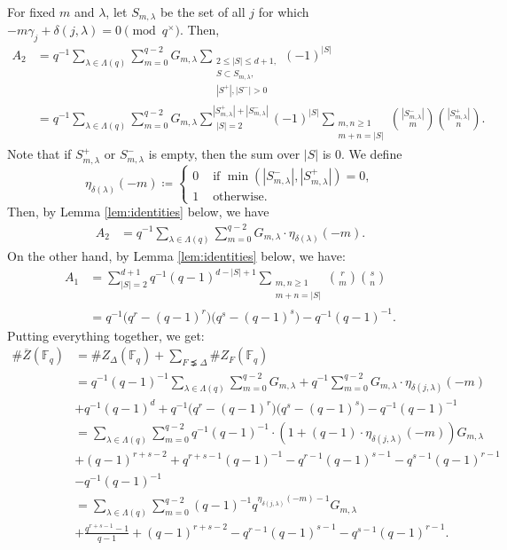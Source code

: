 \documentclass[11pt, reqno]{amsart}
\theoremstyle{plain}
\theoremstyle{definition}
\newcommand{\F}{\mathbb{F}}
\begin{document}
For fixed $m$ and $\lambda$, let $S_{m,\lambda}$  be the set of all $j$ for which  $-m \gamma_j +\delta(j,\lambda)=0 \pmod{q^\times}$. Then,
\begin{align}
A_2 &= q^{-1}\sum_{\lambda \in \Lambda(q)}  \sum_{m=0}^{q-2} G_{m,\lambda } \sum_{\substack{2\le |S|\le d+1, \\ S \subset S_{m,\lambda}, \\ |S^{+}|,|S^{-}|>0  }}(-1)^{|S|} \nonumber\\
&= q^{-1}\sum_{\lambda \in \Lambda(q)}  \sum_{m=0}^{q-2} G_{m,\lambda }\sum_{\substack{|S|=2}}^{|S_{m,\lambda}^+|+|S_{m,\lambda}^-|} (-1)^{|S|} \sum_{\substack{m,n\ge1\\ m+n =|S|}} { \binom{|S_{m,\lambda}^-| }{m}}{\binom{|S_{m,\lambda}^+|}{n}}.\nonumber
\end{align}
Note that if $S_{m,\lambda}^{+}$ or $S_{m,\lambda}^{-}$ is empty, then the sum over $|S|$ is $0$. We define 
\begin{equation}\label{eq:definition-eta}
\eta_{\delta(\lambda)}(-m) \coloneqq \begin{cases}
    0 &  \text{ if } \min( |S_{m,\lambda}^{-}|,|S_{m,\lambda}^{+}|) = 0,\\
    1 & \text{ otherwise.}
\end{cases}
\end{equation}
Then, by Lemma \ref{lem:identities} below, we have
\begin{align}
A_2 &=  q^{-1}\sum_{\lambda \in \Lambda(q)}  \sum_{m=0}^{q-2}G_{m,\lambda} \cdot \eta_{\delta(\lambda)}(-m).
\end{align}
On the other hand, by Lemma \ref{lem:identities} below, we have:
\begin{align*}
    A_1 &= \sum_{ |S|=2 }^{d+1} q^{-1} (q-1)^{d-|S|+1}\sum_{\substack{m,n\ge1\\ m+n =|S|}} {\binom{r}{m}}{\binom{s}{n}}\nonumber \\
    &= q^{-1} \big(q^{r}-(q-1)^{r}\big)\big(q^{s}-(q-1)^{s}\big) - q^{-1}(q-1)^{-1}.
\end{align*}
Putting everything together, we get:
\begin{align*}
    \#\overline{Z}(\F_q) &=  \#Z_\Delta(\F_q) + \sum_{F\precneq\Delta} \#Z_F(\F_q)\\
    &=q^{-1}(q-1)^{-1} \sum_{\lambda \in \Lambda(q)}  \sum_{m=0}^{q-2} G_{m,\lambda }+q^{-1}\sum_{m=0}^{q-2}G_{m,\lambda} \cdot \eta_{\delta(j,\lambda)}(-m)\\
    &+q^{-1}(q-1)^{d} +q^{-1} \big(q^{r}-(q-1)^{r}\big)\big(q^{s}-(q-1)^{s}\big) - q^{-1}(q-1)^{-1}\\
    &=  \sum_{\lambda \in \Lambda(q)} \sum_{m=0}^{q-2}  q^{-1}(q-1)^{-1}\cdot \left( 1+  (q-1) \cdot\eta_{\delta(j,\lambda)}(-m) \right) G_{m,\lambda} \\
    &+(q-1)^{r+s-2}+ q^{r+s-1}(q-1)^{-1} -q^{r-1}(q-1)^{s-1}- q^{s-1}(q-1)^{r-1}\\ 
    &- q^{-1}(q-1)^{-1}\\
    &=\sum_{\lambda \in \Lambda(q)} \sum_{m=0}^{q-2}(q-1)^{-1}  q^{\eta_{\delta(j,\lambda)}(-m)-1} G_{m,\lambda}\\
    &+\frac{q^{r+s-1}-1}{q-1}+ (q-1)^{r+s-2} -q^{r-1}(q-1)^{s-1}- q^{s-1}(q-1)^{r-1}.
\end{align*}
\end{document}
